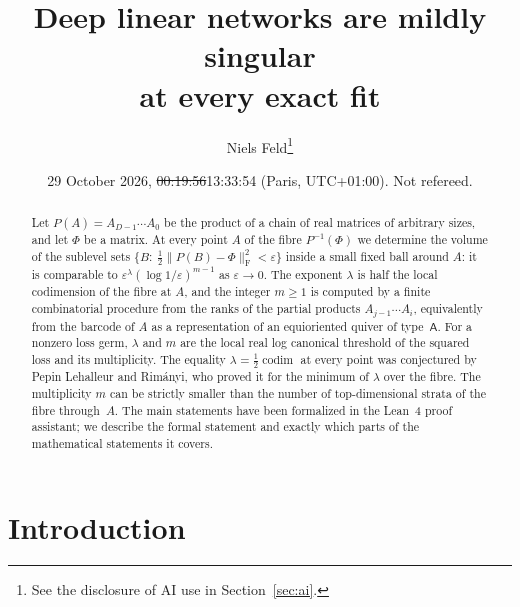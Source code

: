 \documentclass[11pt,a4paper]{article}
\theoremstyle{definition}
\theoremstyle{remark}
\numberwithin{equation}{section}
\newcommand{\codim}{\operatorname{codim}}
\newcommand{\Fr}[1]{\lVert #1\rVert_{\mathrm F}}
\newcommand{\eps}{\varepsilon}
\providecommand{\DIFaddtex}[1]{{\protect\color{blue}#1}} %
\providecommand{\DIFdeltex}[1]{{\protect\color{red}\sout{#1}}} %
\providecommand{\DIFaddbegin}{} %
\providecommand{\DIFaddend}{} %
\providecommand{\DIFdelbegin}{} %
\providecommand{\DIFdelend}{} %
\providecommand{\DIFadd}[1]{\texorpdfstring{\DIFaddtex{#1}}{#1}} %
\providecommand{\DIFdel}[1]{\texorpdfstring{\DIFdeltex{#1}}{}} %
\begin{document}
\title{Deep linear networks are mildly singular\\ at every exact fit}
\author{Niels Feld\thanks{See the disclosure of AI use in Section~\ref{sec:ai}.}}
\date{29 October 2026, \DIFdelbegin \DIFdel{00:19:56}\DIFdelend \DIFaddbegin \DIFadd{13:33:54}\DIFaddend{} (Paris, UTC+01:00). Not refereed.}

\maketitle
\begin{abstract}
Let $P(A)=A_{D-1}\cdots A_0$ be the product of a chain of real matrices of arbitrary sizes, and let $\Phi$ be a matrix. At every point $A$ of the fibre $P^{-1}(\Phi)$ we determine the volume of the sublevel sets $\{B:\ \tfrac12\Fr{P(B)-\Phi}^2<\eps\}$ inside a small fixed ball around $A$: it is comparable to $\eps^{\lambda}(\log 1/\eps)^{m-1}$ as $\eps\to0$. The exponent $\lambda$ is half the local codimension of the fibre at $A$, and the integer $m\ge1$ is computed by a finite combinatorial procedure from the ranks of the partial products $A_{j-1}\cdots A_i$, equivalently from the barcode of $A$ as a representation of an equioriented quiver of type~$\mathsf A$. For a nonzero loss germ, $\lambda$ and $m$ are the local real log canonical threshold of the squared loss and its multiplicity. The equality $\lambda=\tfrac12\codim$ at every point was conjectured by Pepin Lehalleur and Rimányi, who proved it for the minimum of $\lambda$ over the fibre. The multiplicity $m$ can be strictly smaller than the number of top-dimensional strata of the fibre through~$A$. The main statements have been formalized in the Lean~4 proof assistant; we describe the formal statement and exactly which parts of the mathematical statements it covers.
\end{abstract}

\setcounter{tocdepth}{2}
\tableofcontents
\section{Introduction}\label{sec:intro}
\end{document}
